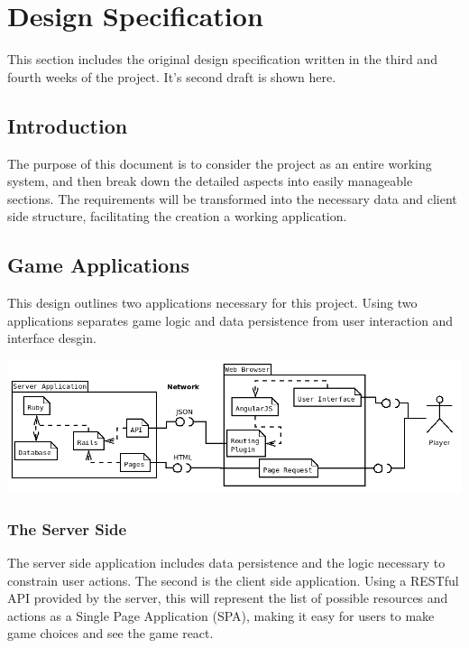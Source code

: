 \chapter{Design Specification}
This section includes the original design specification written in the third and fourth weeks of the project. It's second draft is shown here.

\section{Introduction}
The purpose of this document is to consider the project as an entire working system, and then break down the detailed aspects into easily manageable sections. The requirements will be transformed into the necessary data and client side structure, facilitating the creation a working application.

\section{Game Applications}
This design outlines two applications necessary for this project. Using two applications separates game logic and data persistence from user interaction and interface desgin.

\includegraphics[width=\textwidth]{Images/app3/applications}

\subsection{The Server Side}
The server side application includes data persistence and the logic necessary to constrain user actions. The second is the client side application. Using a RESTful API provided by the server, this will represent the list of possible resources and actions as a Single Page Application (SPA), making it easy for users to make game choices and see the game react.

